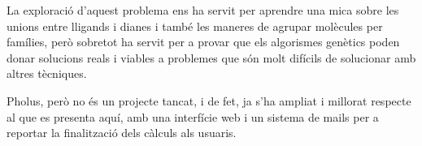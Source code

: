 \documentclass[titlepage,a4paper,12pt]{book}
\begin{document}
La exploració d'aquest problema ens ha servit per aprendre una mica sobre
les unions entre lligands i dianes i també les maneres de agrupar molècules per
famílies, però sobretot ha servit per a provar que els algorismes genètics poden
donar solucions reals i viables a problemes que són molt difícils de solucionar
amb altres tècniques.

Pholus, però no és un projecte tancat, i de fet, ja s'ha ampliat i millorat
respecte al que es presenta aquí, amb una interfície web i un sistema de mails
per a reportar la finalització dels càlculs als usuaris.

\end{document}
